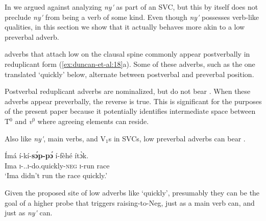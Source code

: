 \documentclass[output=paper
,newtxmath
,modfonts
,nonflat]{langsci/langscibook}
\begin{document}
In  we argued against analyzing \textit{ny\'{\textturnv}\ng} as part of an SVC, but this by itself does not preclude \textit{ny\'{\textturnv}\ng} from being a verb of some kind. Even though \textit{ny\'{\textturnv}\ng} possesses verb-like qualities, in this section we show that it actually behaves more akin to a low preverbal adverb.

 adverbs that attach low on the clausal spine commonly appear postverbally in reduplicant form (\ref{ex:duncan-et-al:18}a). Some of these adverbs, such as the one translated `quickly' below, alternate between postverbal and preverbal position.

\ea\label{ex:duncan-et-al:18}
\z
\z

\noindent Postverbal reduplicant adverbs are nominalized, but do not bear . When these adverbs appear preverbally, the reverse is true. This is significant for the purposes of the present paper because it potentially identifies intermediate space between T$^0$ and \textit{v}$^0$ where  agreeing elements can reside.

Also like \textit{ny\'{\textturnv}\ng}, main verbs, and V$_1$s in SVCs, low preverbal adverbs can bear .

\ea\label{ex:duncan-et-al:19}
\gll \'{I}m\'{a} \'{i}-k\'{i}-\textbf{s\'ɔp-p\'ɔ} \'{i}-f\`{e}h\'{e} \'{i}t\`ɔk. \\
Ima \textsc{i}-{\pst.\foc}.\textsc{i}-do.quickly-\textsc{neg} \textsc{i}-run race \\
\glt `Ima didn't run the race quickly.'
\z

\noindent Given the proposed site of low adverbs like `quickly', presumably they can be the goal of a higher probe that triggers raising-to-Neg, just as a main verb can, and just as \textit{ny\'{\textturnv}\ng} can. 
\end{document}
